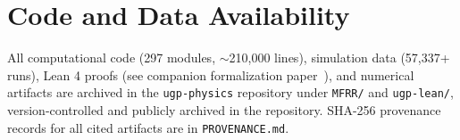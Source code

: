 \documentclass[11pt]{article}
\theoremstyle{plain}
\theoremstyle{definition}
\theoremstyle{remark}
\begin{document}
\section*{Code and Data Availability}
All computational code (297 modules, $\sim$210,000 lines), simulation data (57,337+ runs),
Lean 4 proofs (see companion formalization paper~\cite{SpivackUGPFormalization}), and numerical artifacts are archived in the
\texttt{ugp-physics} repository under \texttt{MFRR/} and \texttt{ugp-lean/},
version-controlled and publicly archived in the repository.
SHA-256 provenance records for all cited artifacts are in \texttt{PROVENANCE.md}.



\end{document}
